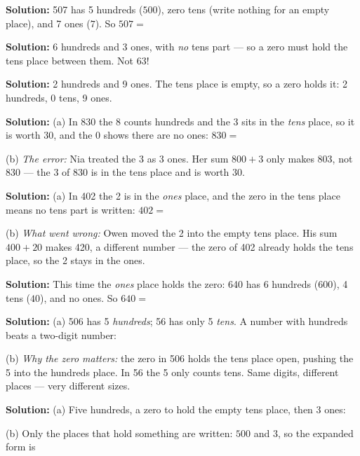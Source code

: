 \documentclass[12pt]{article}
\begin{document}



\textbf{Solution:} 507 has 5 hundreds ($500$), zero tens (write nothing for
an empty place), and 7 ones ($7$). So $507 = {}$ 


\textbf{Solution:} 6 hundreds and 3 ones, with \emph{no} tens part --- so a
zero must hold the tens place between them. Not 63! 


\textbf{Solution:} 2 hundreds and 9 ones. The tens place is empty, so a zero
holds it: 2 hundreds, 0 tens, 9 ones. 


\textbf{Solution:} (a) In 830 the 8 counts hundreds and the 3 sits in the
\emph{tens} place, so it is worth 30, and the 0 shows there are no ones:
$830 = {}$ 

(b) \emph{The error:} Nia treated the 3 as 3 ones. Her sum $800 + 3$ only
makes 803, not 830 --- the 3 of 830 is in the tens place and is worth 30.


\textbf{Solution:} (a) In 402 the 2 is in the \emph{ones} place, and the zero
in the tens place means no tens part is written: $402 = {}$ 

(b) \emph{What went wrong:} Owen moved the 2 into the empty tens place.
His sum $400 + 20$ makes 420, a different number --- the zero of 402 already
holds the tens place, so the 2 stays in the ones.


\textbf{Solution:} This time the \emph{ones} place holds the zero: 640 has
6 hundreds ($600$), 4 tens ($40$), and no ones. So $640 = {}$ 


\textbf{Solution:} (a) 506 has 5 \emph{hundreds}; 56 has only 5 \emph{tens}.
A number with hundreds beats a two-digit number: 

(b) \emph{Why the zero matters:} the zero in 506 holds the tens place open,
pushing the 5 into the hundreds place. In 56 the 5 only counts tens. Same
digits, different places --- very different sizes.


\textbf{Solution:} (a) Five hundreds, a zero to hold the empty tens place,
then 3 ones: 

(b) Only the places that hold something are written: $500$ and $3$, so the
expanded form is 
\end{document}
